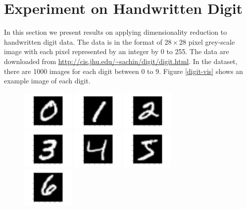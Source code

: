 \documentclass[11pt]{article}
\begin{document}
\section*{Experiment on Handwritten Digit}
In this section we present results on applying dimensionality reduction to handwritten digit data. The data is in the format of $28\times 28$ pixel grey-scale image with each pixel represented by an integer by 0 to 255. The data are downloaded from \url{http://cis.jhu.edu/~sachin/digit/digit.html}. In the dataset, there are 1000 images for each digit between 0 to 9. Figure \ref{digit-vis} shows an example image of each digit.
\begin{figure}[H]
\begin{center}
\includegraphics[width=1in]{0.png}
\includegraphics[width=1in]{1.png}
\includegraphics[width=1in]{2.png}\\
\includegraphics[width=1in]{3.png}
\includegraphics[width=1in]{4.png}
\includegraphics[width=1in]{5.png}\\
\includegraphics[width=1in]{6.png}

\end{center}
\end{figure}
\end{document}
